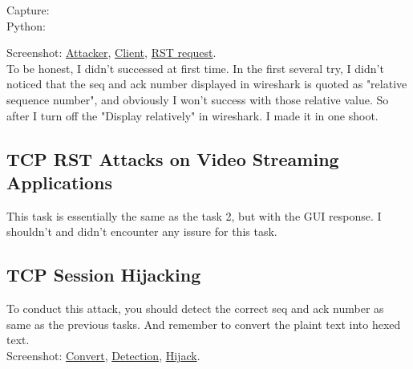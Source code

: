 \documentclass{article}
\begin{document}
\begin{tlist}{3}
  Capture: \\
  Python:
  \begin{tlist}{2}
    \item[]
  \end{tlist}
  Screenshot:
  \href{https://i.loli.net/2018/09/12/5b9810585b7d3.png}{Attacker},
  \href{https://i.loli.net/2018/09/12/5b98105863974.png}{Client},
  \href{https://i.loli.net/2018/09/12/5b981058a7e99.png}{RST request}.\\
  To be honest, I didn't successed at first time. In the first several try, I didn't noticed that the seq and ack number displayed in wireshark is quoted as "relative sequence number", and obviously I won't success with those relative value. So after I turn off the "Display relatively" in wireshark. I made it in one shoot.
\end{tlist}

\subsection{TCP RST Attacks on Video Streaming Applications}
This task is essentially the same as the task 2, but with the GUI response. I shouldn't and didn't encounter any issure for this task.

\subsection{TCP Session Hijacking}
To conduct this attack, you should detect the correct seq and ack number as same as the previous tasks. And remember to convert the plaint text into hexed text.\\
Screenshot:
\href{https://i.loli.net/2018/09/13/5b99bffc69cdc.png}{Convert},
\href{https://i.loli.net/2018/09/13/5b99c04020f57.png}{Detection},
\href{https://i.loli.net/2018/09/13/5b99c05fee0db.png}{Hijack}.
\end{document}
